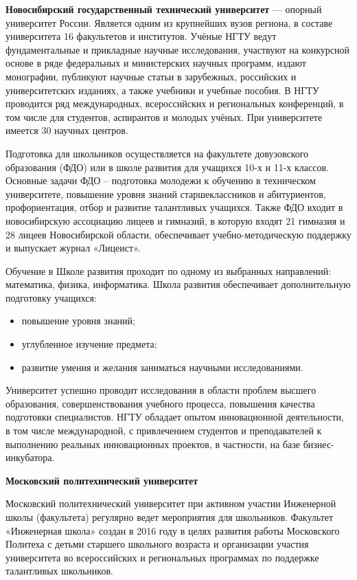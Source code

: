 \textbf{Новосибирский государственный технический университет} — опорный университет России. Является одним из крупнейших вузов региона, в составе университета 16 факультетов и институтов. Учёные НГТУ ведут фундаментальные и прикладные научные исследования, участвуют на конкурсной основе в ряде федеральных и министерских научных программ, издают монографии, публикуют научные статьи в зарубежных, российских и университетских изданиях, а также учебники и учебные пособия. В НГТУ проводится ряд международных, всероссийских и региональных конференций, в том числе для студентов, аспирантов и молодых учёных. При университете имеется 30 научных центров.

Подготовка для школьников осуществляется на факультете довузовского образования (ФДО) или в школе развития для учащихся 10-х и 11-х классов. Основные задачи ФДО – подготовка молодежи к обучению в техническом университете, повышение уровня знаний старшеклассников и абитуриентов, профориентация, отбор и развитие талантливых учащихся. Также ФДО входит в новосибирскую ассоциацию лицеев и гимназий, в которую входят 21 гимназия и 28 лицеев Новосибирской области, обеспечивает учебно-методическую поддержку и выпускает журнал «Лицеист».

Обучение в Школе развития проходит по одному из выбранных направлений: математика, физика, информатика. Школа развития обеспечивает дополнительную подготовку учащихся:
\begin{itemize}
    \item повышение уровня знаний;
    \item углубленное изучение предмета;
    \item развитие умения и желания заниматься научными исследованиями.
\end{itemize}

Университет успешно проводит исследования в области проблем высшего образования, совершенствования учебного процесса, повышения качества подготовки специалистов. НГТУ обладает опытом инновационной деятельности, в том числе международной, с привлечением студентов и преподавателей к выполнению реальных инновационных проектов, в частности, на базе бизнес-инкубатора.

\textbf{Московский политехнический университет}

Московский политехнический университет при активном участии Инженерной школы (факультета) регулярно ведет мероприятия для школьников. Факультет «Инженерная школа» создан в 2016 году в целях развития работы Московского Политеха с детьми старшего школьного возраста и организации участия университета во всероссийских и региональных программах по поддержке талантливых школьников.

